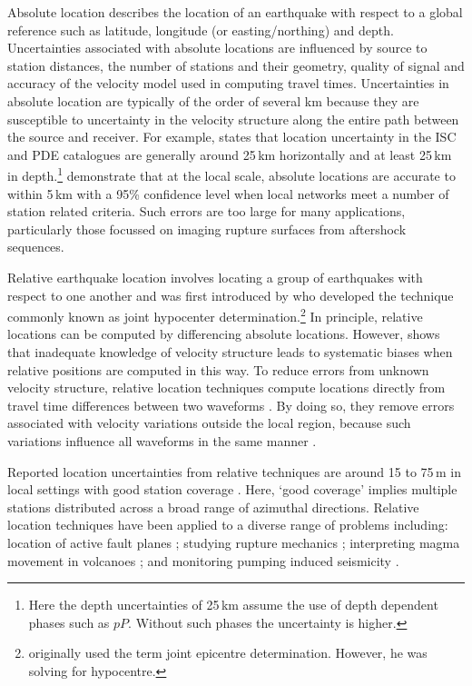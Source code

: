 \documentclass[extra]{gji}
\begin{document}
Absolute location describes the location of an earthquake with
respect to a global reference such as latitude, longitude (or
easting/northing) and depth. Uncertainties associated with absolute
locations are influenced by source to station distances, the number
of stations and their geometry, quality of signal and accuracy of
the velocity model used in computing travel times. Uncertainties in
absolute location are typically of the order of several km because
they are susceptible to uncertainty in the velocity structure along
the entire path between the source and receiver. For example,
\citet{dr_Shearer99a} states that location uncertainty in the ISC
and PDE catalogues are generally around 25\,km horizontally and at
least 25\,km in depth.\footnote{Here the depth uncertainties of
25\,km assume the use of depth dependent phases such as $pP$.
Without such phases the uncertainty is higher.}
\citet{dr_Bondar04a} demonstrate that at the local scale, absolute
locations are accurate to within 5\,km with a 95\% confidence level
when local networks meet a number of station related criteria. Such
errors are too large for many applications, particularly those
focussed on imaging rupture surfaces from aftershock sequences.

Relative earthquake location involves locating a group of
earthquakes with respect to one another and was first introduced by
\citet{dr_Douglas67a} who developed the technique commonly known as
joint hypocenter determination.\footnote{\citet{dr_Douglas67a}
originally used the term joint epicentre determination. However, he
was solving for hypocentre.} In principle, relative locations can be
computed by differencing absolute locations. However,
\citet{dr_Pavlis92a} shows that inadequate knowledge of velocity
structure leads to systematic biases when relative positions are
computed in this way. To reduce errors from unknown velocity
structure, relative location techniques compute locations directly
from travel time differences between two waveforms
\citep{dr_Ito85a, dr_Got94a, dr_Nadeau97a, dr_Waldhauser99a}. By doing
so, they remove errors associated with velocity variations outside
the local region, because such variations influence all waveforms in
the same manner \citep{dr_Shearer99a}.

Reported location uncertainties from relative techniques are  around
15 to 75\,m in local settings with good station coverage
\citep{dr_Ito85a, dr_Got94a,
dr_Waldhauser99a,dr_Waldhauser08a}. Here, `good coverage' implies
multiple stations distributed across a broad range of azimuthal
directions. Relative location techniques have been applied to a
diverse range of problems including: location of active fault planes
\citep{dr_Deichmann92a, dr_Got94a, dr_Waldhauser99a,
dr_Waldhauser02a, dr_Shearer05a}; studying rupture mechanics
\citep{dr_Rubin99a, dr_Rubin02a}; interpreting magma
movement in volcanoes \citep{dr_Fremont87a}; and
monitoring pumping induced seismicity \citep{dr_Lees98a,
dr_Ake05a}.
\end{document}
